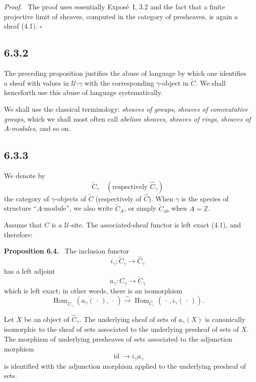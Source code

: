 \documentclass[11pt]{article}
\newcommand{\U}{\mathcal{U}}
\newcommand{\Hom}{\operatorname{Hom}}
\newcommand{\qedtext}{\hfill\(\square\)}
\newcommand{\blank}{\,\cdot\,}
\newenvironment{statement}[1]{\par\medskip\noindent\textbf{#1.}\ }{\par\medskip}
\newenvironment{prooftext}{\par\noindent\emph{Proof.}\ }{\par\medskip}
\begin{document}
\begin{prooftext}
The proof uses essentially Expos\'e~I, 3.2 and the fact that a finite projective limit of sheaves, computed in the category of presheaves, is again a sheaf (4.1). \qedtext
\end{prooftext}

\subsection*{6.3.2}
The preceding proposition justifies the abuse of language by which one identifies a sheaf with values in \(\U\)-\(\gamma\) with the corresponding \(\gamma\)-object in \(\widetilde C\). We shall henceforth use this abuse of language systematically.

We shall use the classical terminology: \emph{sheaves of groups}, \emph{sheaves of commutative groups}, which we shall most often call \emph{abelian sheaves}, \emph{sheaves of rings}, \emph{sheaves of \(A\)-modules}, and so on.

\subsection*{6.3.3}
We denote by
\[
\widetilde C_{\gamma}\quad(\text{respectively } \widehat C_{\gamma})
\]
the category of \(\gamma\)-objects of \(\widetilde C\) (respectively of \(\widehat C\)). When \(\gamma\) is the species of structure ``\(A\)-module'', we also write \(\widetilde C_A\), or simply \(\widetilde C_{\mathrm{ab}}\) when \(A=\mathbb Z\).

Assume that \(C\) is a \(\U\)-site. The associated-sheaf functor is left exact (4.1), and therefore:

\begin{statement}{Proposition 6.4}
The inclusion functor
\[
i_{\gamma}:\widetilde C_{\gamma}\to \widehat C_{\gamma}
\]
has a left adjoint
\[
a_{\gamma}:\widehat C_{\gamma}\to\widetilde C_{\gamma}
\]
which is left exact; in other words, there is an isomorphism
\[
\Hom_{\widetilde C_{\gamma}}(a_{\gamma}(\blank),\blank)
\xrightarrow{\sim}
\Hom_{\widehat C_{\gamma}}(\blank,i_{\gamma}(\blank)).
\]

Let \(X\) be an object of \(\widehat C_{\gamma}\). The underlying sheaf of sets of \(a_{\gamma}(X)\) is canonically isomorphic to the sheaf of sets associated to the underlying presheaf of sets of \(X\). The morphism of underlying presheaves of sets associated to the adjunction morphism
\[
\operatorname{id}\to i_{\gamma}a_{\gamma}
\]
is identified with the adjunction morphism applied to the underlying presheaf of sets.
\end{statement}
\end{document}
